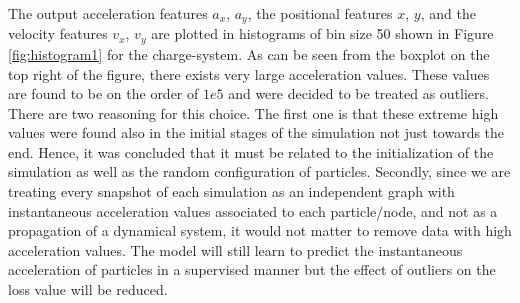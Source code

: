 \documentclass{article}
\begin{document}
The output acceleration features $a_x$, $a_y$, the positional features $x$, $y$, and the velocity features $v_x$, $v_y$ are plotted in histograms of bin size 50 shown in Figure \ref{fig:histogram1} for the charge-system. As can be seen from the boxplot on the top right of the figure, there exists very large acceleration values. These values are found to be on the order of $1e5$ and were decided to be treated as outliers. There are two reasoning for this choice. The first one is that these extreme high values were found also in the initial stages of the simulation not just towards the end. Hence, it was concluded that it must be related to the initialization of the simulation as well as the random configuration of particles. Secondly, since we are treating every snapshot of each simulation as an independent graph with instantaneous acceleration values associated to each particle/node, and not as a propagation of a dynamical system, it would not matter to remove data with high acceleration values. The model will still learn to predict the instantaneous acceleration of particles in a supervised manner but the effect of outliers on the loss value will be reduced. 
\end{document}
